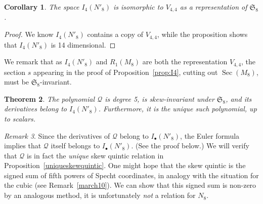 \documentclass{amsart}
\newtheorem{theorem}{Theorem}[section]
\newtheorem{corollary}[theorem]{Corollary}
\theoremstyle{definition}
\theoremstyle{remark}
\newtheorem{remark}[theorem]{\it Remark}
\DeclareMathOperator{\Sec}{Sec}
\def\SS{\mathfrak{S}}
\def\quintic{\mathcal{Q}}
\begin{document}
\begin{corollary}
\label{cor:I4}
The space $I_4(N'_8)$ is isomorphic to $V_{4,4}$ as a representation of $\SS_8$.
\end{corollary}

\begin{proof}
We know $I_4(N'_8)$ contains a copy of $V_{4,4}$, while the proposition shows that $I_4(N'_8)$ is 14 dimensional.
\end{proof}

We remark that as $I_4(N'_8)$ and
  $R_1(M_8)$ are both the representation $V_{4,4}$, 
the section  $s$ appearing in the proof of Proposition~\ref{prop:I4},
 cutting out $\Sec(M_8)$,  must be $\SS_8$-invariant.


\begin{theorem}
\label{t:Qdual}
The polynomial $\quintic$ is degree 5, is skew-invariant under $\SS_8$, and its derivatives belong to $I_4(N'_8)$.
Furthermore, it is the unique such polynomial, up to scalars.
\end{theorem}


\begin{remark}
Since the derivatives of $\quintic$ belong to $I_{\bullet}(N'_8)$, the Euler formula implies that $\quintic$ itself
belongs to $I_{\bullet}(N'_8)$.  (See the proof below.)
We will verify that $\quintic$ is in fact the {\em unique} skew
quintic relation in Proposition~\ref{uniqueskewquintic}. 
One might hope that the skew quintic is the signed sum of fifth powers
of Specht coordinates, in analogy with the situation for the cubic
(see Remark~\ref{march10}).  We can show that this signed sum is non-zero
by an analogous method, it is unfortunately {\em not}  a relation for $N_8$.
\end{remark}
\end{document}
